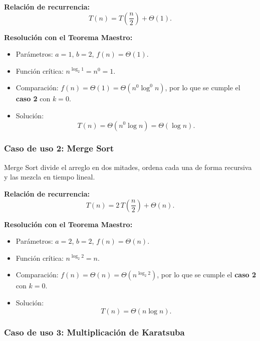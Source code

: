 \documentclass{article}
\begin{document}
        \textbf{Relación de recurrencia:}
        \[
        T(n) = T\!\left(\frac{n}{2}\right) + \Theta(1).
        \]
        
        \textbf{Resolución con el Teorema Maestro:}
        
        \begin{itemize}
        \item Parámetros: $a = 1$, $b = 2$, $f(n) = \Theta(1)$.
        \item Función crítica: $n^{\log_2 1} = n^{0} = 1$.
        \item Comparación: $f(n) = \Theta(1) = \Theta\!\left(n^{0}\log^{0} n\right)$,
                por lo que se cumple el \textbf{caso 2} con $k = 0$.
        \item Solución:
                \[
                T(n) = \Theta\!\left(n^{0}\log n\right) = \Theta(\log n).
                \]
        \end{itemize}
        
        \subsubsection{Caso de uso 2: Merge Sort}
        
        Merge Sort divide el arreglo en dos mitades, ordena cada una de forma
        recursiva y las mezcla en tiempo lineal.
        
        \textbf{Relación de recurrencia:}
        \[
        T(n) = 2\,T\!\left(\frac{n}{2}\right) + \Theta(n).
        \]
        
        \textbf{Resolución con el Teorema Maestro:}
        
        \begin{itemize}
        \item Parámetros: $a = 2$, $b = 2$, $f(n) = \Theta(n)$.
        \item Función crítica: $n^{\log_2 2} = n$.
        \item Comparación: $f(n) = \Theta(n) = \Theta\!\left(n^{\log_2 2}\right)$,
                por lo que se cumple el \textbf{caso 2} con $k = 0$.
        \item Solución:
                \[
                T(n) = \Theta(n\log n).
                \]
        \end{itemize}
        
        \subsubsection{Caso de uso 3: Multiplicación de Karatsuba}
        
\end{document}
